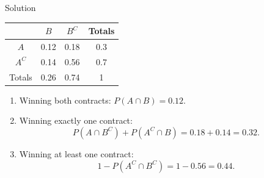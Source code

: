 \documentclass[12pt]{beamer}
\begin{document}
\begin{frame}{Solution}
	\begin{center}
		\begin{tabular}{cccc}
			\toprule
			&$B$&$B^C$&Totals\\
			\hline
			$A$&0.12&0.18&0.3\\
			$A^C$&0.14&0.56&0.7\\
			\hline
			Totals&0.26&0.74&1\\
			\bottomrule
		\end{tabular}
	\end{center}
	\begin{enumerate}[label=\textcolor{blue}{(\alph*)}]
	\item Winning both contracts: $P(A\cap B)=0.12$.
	\item Winning exactly one contract:
	$$P(A\cap B^C)+P(A^C\cap B)=0.18+0.14=0.32.$$
	\item Winning at least one contract:
	$$1-P(A^C\cap B^C)=1-0.56=0.44.$$
\end{enumerate}
\end{frame}
\end{document}
